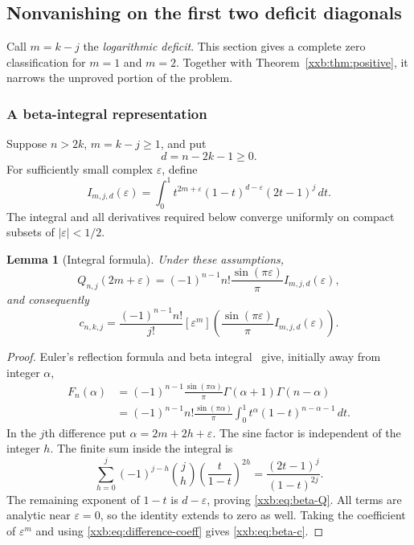 \documentclass[11pt,a4paper]{article}
\numberwithin{equation}{section}
\newtheorem{lemma}[theorem]{Lemma}
\theoremstyle{definition}
\theoremstyle{remark}
\theoremstyle{plain}
\begin{document}
\subsection{Nonvanishing on the first two deficit diagonals}\label{xxb:sec:small-m}
Call $m=k-j$ the \emph{logarithmic deficit}. This section gives a complete
zero classification for $m=1$ and $m=2$. Together with
Theorem~\ref{xxb:thm:positive}, it narrows the unproved portion of the problem.

\subsubsection{A beta-integral representation}
Suppose $n>2k$, $m=k-j\ge1$, and put
\begin{equation}\label{xxb:eq:d}
 d=n-2k-1\ge0.
\end{equation}
For sufficiently small complex $\varepsilon$, define
\begin{equation}\label{xxb:eq:I}
 I_{m,j,d}(\varepsilon)=
 \int_0^1 t^{2m+\varepsilon}(1-t)^{d-\varepsilon}(2t-1)^j\,dt.
\end{equation}
The integral and all derivatives required below converge uniformly on
compact subsets of $|\varepsilon|<1/2$.

\begin{lemma}[Integral formula]\label{xxb:lem:beta}
Under these assumptions,
\begin{equation}\label{xxb:eq:beta-Q}
 Q_{n,j}(2m+\varepsilon)
 =(-1)^{n-1}n!\frac{\sin(\pi\varepsilon)}{\pi}
    I_{m,j,d}(\varepsilon),
\end{equation}
and consequently
\begin{equation}\label{xxb:eq:beta-c}
 c_{n,k,j}=\frac{(-1)^{n-1}n!}{j!}
 [\varepsilon^m]\left(
 \frac{\sin(\pi\varepsilon)}{\pi}I_{m,j,d}(\varepsilon)\right).
\end{equation}
\end{lemma}
\begin{proof}
Euler's reflection formula and beta integral~\cite{dlmf-reflection,dlmf-beta}
give, initially away from integer $\alpha$,
\begin{align*}
 F_n(\alpha)
 &=(-1)^{n-1}\frac{\sin(\pi\alpha)}{\pi}
      \Gamma(\alpha+1)\Gamma(n-\alpha)\\
 &=(-1)^{n-1}n!\frac{\sin(\pi\alpha)}{\pi}
      \int_0^1t^\alpha(1-t)^{n-\alpha-1}\,dt.
\end{align*}
In the $j$th difference put $\alpha=2m+2h+\varepsilon$. The sine factor
is independent of the integer $h$. The finite sum inside the integral is
\[
 \sum_{h=0}^j(-1)^{j-h}\binom jh
     \left(\frac{t}{1-t}\right)^{2h}
 =\frac{(2t-1)^j}{(1-t)^{2j}}.
\]
The remaining exponent of $1-t$ is $d-\varepsilon$, proving
\eqref{xxb:eq:beta-Q}. All terms are analytic near $\varepsilon=0$, so the
identity extends to zero as well. Taking the coefficient of
$\varepsilon^m$ and using \eqref{xxb:eq:difference-coeff} gives
\eqref{xxb:eq:beta-c}.
\end{proof}
\end{document}
